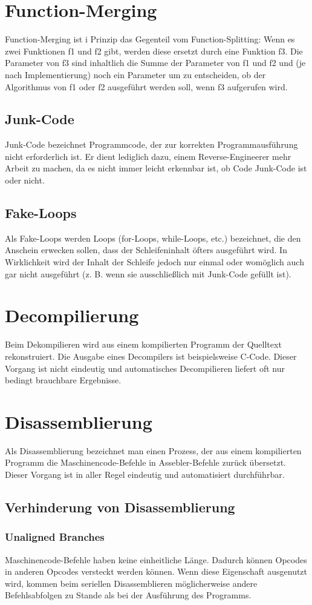 \begin{multicols}{3}
\section{Function-Merging}
Function-Merging ist i Prinzip das Gegenteil vom Function-Splitting: Wenn es zwei Funktionen f1 und f2 gibt, werden diese ersetzt durch eine Funktion f3. Die Parameter von f3 sind inhaltlich die Summe der Parameter von f1 und f2 und (je nach Implementierung) noch ein Parameter um zu entscheiden, ob der Algorithmus von f1 oder f2 ausgeführt werden soll, wenn f3 aufgerufen wird.
\subsection{Junk-Code}
Junk-Code bezeichnet Programmcode, der zur korrekten Programmausführung nicht erforderlich ist. Er dient lediglich dazu, einem Reverse-Engineerer mehr Arbeit zu machen, da es nicht immer leicht erkennbar ist, ob Code Junk-Code ist oder nicht.
\subsection{Fake-Loops}
Als Fake-Loops werden Loops (for-Loops, while-Loops, etc.) bezeichnet, die den Anschein erwecken sollen, dass der Schleifeninhalt öfters ausgeführt wird. In Wirklichkeit wird der Inhalt der Schleife jedoch nur einmal oder womöglich auch gar nicht ausgeführt (z. B. wenn sie ausschließlich mit Junk-Code gefüllt ist).
\section{Decompilierung}
Beim Dekompilieren wird aus einem kompilierten Programm der Quelltext rekonstruiert. Die Ausgabe eines Decompilers ist beispielsweise C-Code. Dieser Vorgang ist nicht eindeutig und automatisches Decompilieren liefert oft nur bedingt brauchbare Ergebnisse.
\section{Disassemblierung}
Als Disassemblierung bezeichnet man einen Prozess, der aus einem kompilierten Programm die Maschinencode-Befehle in Assebler-Befehle zurück übersetzt. Dieser Vorgang ist in aller Regel eindeutig und automatisiert durchführbar.
\subsection{Verhinderung von Disassemblierung}
\subsubsection{Unaligned Branches}
Maschinencode-Befehle haben keine einheitliche Länge. Dadurch können Opcodes in anderen Opcodes versteckt werden können. Wenn diese Eigenschaft ausgenutzt wird, kommen beim seriellen Disassemblieren möglicherweise andere Befehlsabfolgen zu Stande als bei der Ausführung des Programms. 
\end{multicols}